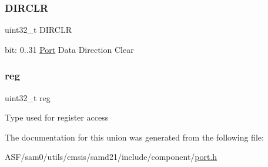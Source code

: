 \subsubsection{\texorpdfstring{DIRCLR}{DIRCLR}}
{\footnotesize\ttfamily uint32\+\_\+t D\+I\+R\+C\+LR}

bit\+: 0..31 \mbox{\hyperlink{struct_port}{Port}} Data Direction Clear \mbox{\label{union_p_o_r_t___d_i_r_c_l_r___type_a6b91636401516a477989a336376d7b40}} 
\subsubsection{\texorpdfstring{reg}{reg}}
{\footnotesize\ttfamily uint32\+\_\+t reg}

Type used for register access 

The documentation for this union was generated from the following file\+:\begin{DoxyCompactItemize}
\item 
A\+S\+F/sam0/utils/cmsis/samd21/include/component/\mbox{\hyperlink{utils_2cmsis_2samd21_2include_2component_2port_8h}{port.\+h}}\end{DoxyCompactItemize}
